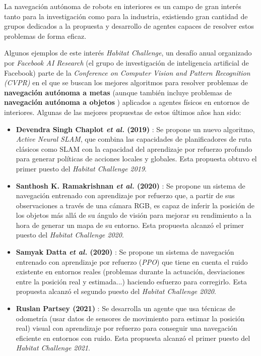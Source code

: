 La navegación autónoma de robots en interiores es un campo de gran interés tanto para la investigación como para la industria, existiendo gran cantidad de grupos dedicados a la propuesta y desarrollo de agentes capaces de resolver estos problemas de forma eficaz.

Algunos ejemplos de este interés \textit{Habitat Challenge}, un desafío anual organizado por  \textit{Facebook AI Research} (el grupo de investigación de inteligencia artificial de Facebook) parte de la \textit{Conference on Computer Vision and Pattern Recognition (CVPR)} en el que se buscan los mejores algoritmos para resolver problemas de \textbf{navegación autónoma a metas} \cite{habitat2020sim2real} (aunque también incluye problemas de \textbf{navegación autónoma a objetos} \cite{batra2020objectnav}) aplicados a agentes físicos en entornos de interiores. Algunas de las mejores propuestas de estos últimos años han sido:
 
\begin{itemize}
	\item \textbf{Devendra Singh Chaplot \textit{et al.} (2019)} \cite{DBLP:journals/corr/abs-2004-05155}: Se propone un nuevo algoritmo, \textit{Active Neural SLAM}, que combina las capacidades de planificadores de ruta clásicos como SLAM con la capacidad del aprendizaje por refuerzo profundo para generar políticas de acciones locales y globales. Esta propuesta obtuvo el primer puesto del \textit{Habitat Challenge 2019}.
	\item \textbf{Santhosh K. Ramakrishnan \textit{et al.} (2020)} \cite{DBLP:journals/corr/abs-2008-09285}: Se propone un sistema de navegación entrenado con aprendizaje por refuerzo que, a partir de sus observaciones a través de una cámara RGB, es capaz de inferir la posición de los objetos más allá de su ángulo de visión para mejorar su rendimiento a la hora de generar un mapa de su entorno. Esta propuesta alcanzó el primer puesto del \textit{Habitat Challenge 2020}.
	 \item \textbf{Samyak Datta \textit{et al.} (2020)} \cite{DBLP:journals/corr/abs-2009-03231}: Se propone un sistema de navegación entrenado con aprendizaje por refuerzo (\textit{PPO}) que tiene en cuenta el ruido existente en entornos reales (problemas durante la actuación, desviaciones entre la posición real y estimada...) haciendo esfuerzo para corregirlo. Esta propuesta alcanzó el segundo puesto del \textit{Habitat Challenge 2020}.
	 \item \textbf{Ruslan Partsey (2021)} \cite{Partsey2021}: Se desarrolla un agente que usa técnicas de odometría (usar datos de sensores de movimiento para estimar la posición real) visual con aprendizaje por refuerzo para conseguir una navegación eficiente en entornos con ruido. Esta propuesta alcanzó el primer puesto del \textit{Habitat Challenge 2021}.
\end{itemize}

